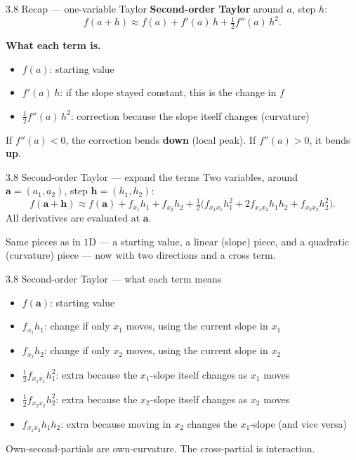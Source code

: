 \documentclass[11pt,aspectratio=169]{beamer}
\begin{document}
\begin{frame}{3.8 Recap --- one-variable Taylor}
  \footnotesize
  \textbf{Second-order Taylor} around $a$, step $h$:
  \[
    f(a+h)\approx f(a)+f'(a)\,h+\tfrac12 f''(a)\,h^2.
  \]

  \medskip
  \textbf{What each term is.}\
  \begin{itemize}
    \item $f(a)$: starting value
    \item $f'(a)\,h$: if the slope stayed constant, this is the change in $f$
    \item $\tfrac12 f''(a)\,h^2$: correction because the slope itself changes (curvature)
  \end{itemize}

  \medskip
  If $f''(a)<0$, the correction bends \textbf{down} (local peak). If $f''(a)>0$, it bends \textbf{up}.
\end{frame}

\begin{frame}{3.8 Second-order Taylor --- expand the terms}
  \footnotesize
  Two variables, around $\mathbf{a}=(a_1,a_2)$, step $\mathbf{h}=(h_1,h_2)$:
  \[
    f(\mathbf{a}+\mathbf{h})
    \approx f(\mathbf{a})
      + f_{x_1}h_1 + f_{x_2}h_2
      + \tfrac12\bigl(
        f_{x_1x_1}h_1^2 + 2f_{x_1x_2}h_1 h_2 + f_{x_2x_2}h_2^2
      \bigr).
  \]
  All derivatives are evaluated at $\mathbf{a}$.

  \medskip
  Same pieces as in $1$D --- a starting value, a linear (slope) piece, and a quadratic (curvature) piece --- now with two directions and a cross term.
\end{frame}

\begin{frame}{3.8 Second-order Taylor --- what each term means}
  \footnotesize
  \begin{itemize}
    \item $f(\mathbf{a})$: starting value
    \item $f_{x_1}h_1$: change if only $x_1$ moves, using the current slope in $x_1$
    \item $f_{x_2}h_2$: change if only $x_2$ moves, using the current slope in $x_2$
    \item $\tfrac12 f_{x_1x_1}h_1^2$: extra because the $x_1$-slope itself changes as $x_1$ moves
    \item $\tfrac12 f_{x_2x_2}h_2^2$: extra because the $x_2$-slope itself changes as $x_2$ moves
    \item $f_{x_1x_2}h_1 h_2$: extra because moving in $x_2$ changes the $x_1$-slope (and vice versa)
  \end{itemize}

  \medskip
  Own-second-partials are own-curvature. The cross-partial is interaction.
\end{frame}
\end{document}
